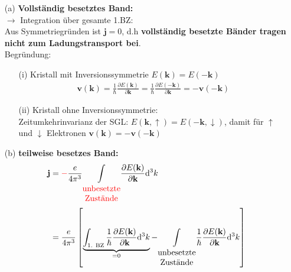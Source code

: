 \begin{itemize}
    \item[(a)] \textbf{Vollständig besetztes Band:} \\
        $\rightarrow$ Integration über gesamte 1.BZ: \\
        Aus Symmetriegründen ist $\textbf{j} = 0$, d.h \textbf{vollständig besetzte Bänder tragen nicht zum Ladungstransport bei}. \\
        Begründung:
        \begin{itemize}
            \item[(i)] Kristall mit Inversionssymmetrie $E(\textbf{k}) = E(- \textbf{k})$ \\
                \begin{align}
                    \textbf{v}(\textbf{k}) = \frac{1}{\hbar} \frac{\partial E(\textbf{k})}{\partial \textbf{k}} = \frac{1}{\hbar} \frac{\partial E(-\textbf{k})}{\partial \textbf{k}} = - \textbf{v}(-\textbf{k})
                \end{align}
            \item[(ii)] Kristall ohne Inversionssymmetrie:\\
            Zeitumkehrinvarianz der SGL: $E(\textbf{k},\uparrow) = E(-\textbf{k},\downarrow) $, damit für $\uparrow$ und $\downarrow$ Elektronen $\textbf{v}(\textbf{k}) = - \textbf{v}(-\textbf{k})$
        \end{itemize}
    \item[(b)] \textbf{teilweise besetzes Band:}
        \begin{align}
            \textbf{j} &= \textcolor{red}{-} \frac{e}{4\pi^3} \underset{\begin{matrix}
                \text{\textcolor{red}{unbesetzte}}\\
                \text{\textcolor{red}{Zustände}}
            \end{matrix}}{\int} \frac{\partial E(\textbf{k}) }{\partial \textbf{k}} \mathrm{d}^3 k\\
             &= \frac{e}{4\pi^3} \left[    \underbrace{\int_\text{1. BZ} \frac{1}{\hbar} \frac{\partial E(\textbf{k}) }{\partial \textbf{k}} \mathrm{d}^3 k }_{=0}   -  \underset{\begin{matrix}
                \text{unbesetzte}\\
                \text{Zustände}
            \end{matrix}}{\int} \frac{1}{\hbar} \frac{\partial E(\textbf{k}) }{\partial \textbf{k}} \mathrm{d}^3 k \right] \\

\end{align}
\end{itemize}
